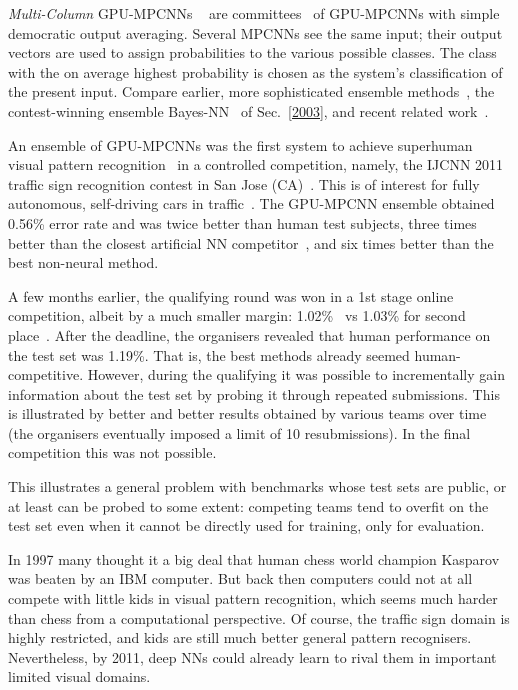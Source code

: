 \documentclass[letterpaper]{article}
\begin{document}
\begin{CJK*}{UTF8}{gbsn}
\begin{sloppypar}
{\em Multi-Column} GPU-MPCNNs ~\citep{ciresan:2011ijcnn} 
are committees~\citep{breiman:1996,Schapire:90,wolpert:92stacked,hashem:1992,Ueda2000,dietterich2000} of GPU-MPCNNs  with simple democratic output averaging. 
Several MPCNNs see the same input; 
their output vectors are used to assign probabilities to the various possible classes. 
The class with the on average highest probability is chosen as the system's classification of the present input. 
Compare earlier, more sophisticated ensemble methods~\citep{Schapire:90},
the contest-winning ensemble Bayes-NN~\citep{neal2006b}
of Sec.~\ref{2003},
and recent related work~\citep{shao2014}.


An ensemble of GPU-MPCNNs was the first system to achieve
superhuman visual pattern recognition~\citep{ciresan:2011ijcnn,ciresan:2012NN} in a controlled competition, namely,
the IJCNN 2011 traffic sign recognition contest in San Jose (CA)~\citep{stallkamp:11,stallkamp:12}.
This is of interest for fully autonomous, self-driving cars in traffic~\citep[e.g.,][]{Dickmanns:94}.
The GPU-MPCNN ensemble obtained 0.56\% error rate and was twice better
 than human test subjects, 
three times better than the closest artificial NN competitor~\citep{sermanet-ijcnn-11}, and
six times better than the best non-neural method.

A few months earlier, the qualifying round was won in a 1st stage online competition, albeit by a much smaller margin: 1.02\%~\citep{ciresan:2011ijcnn} vs 1.03\% for second place~\citep{sermanet-ijcnn-11}. After the deadline, the organisers revealed that human performance on the test set was 1.19\%. That is, the best methods already seemed human-competitive. However, during the qualifying it was possible to incrementally gain information about the test set by probing it through repeated submissions. This is illustrated by better and better results obtained by various teams over time~\citep{stallkamp:12}
(the organisers eventually imposed a limit of 10 resubmissions). 
In the final competition this was not possible.

This illustrates a general problem with benchmarks whose test sets are public, or at least can be probed
to some extent: competing teams tend to overfit on the test set even when it 
cannot be directly used for training, only for evaluation.

In 1997 many thought it a big deal that human chess world champion Kasparov was beaten by an IBM computer. But back then computers could not at all compete with little kids in visual pattern recognition, which seems much harder than chess from a computational perspective. 
Of course, the traffic sign domain is highly restricted,
and kids are still much better general pattern recognisers.
Nevertheless, by 2011, deep NNs could
 already learn to rival them in important limited visual domains.


\end{sloppypar}
\end{CJK*}
\end{document}
